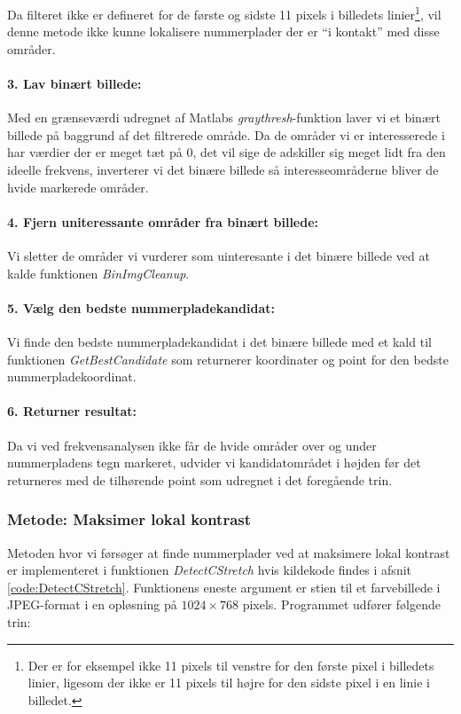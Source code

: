 Da filteret ikke er defineret for de første og sidste 11 pixels i billedets linier\footnote{Der er for eksempel ikke 11 pixels til venstre for den første pixel i billedets linier, ligesom der ikke er 11 pixels til højre for den sidste pixel i en linie i billedet.}, vil denne metode ikke kunne lokalisere nummerplader der er ``i kontakt'' med disse områder.

\paragraph{3. Lav binært billede:}
Med en grænseværdi udregnet af Matlabs \textit{graythresh}-funktion laver vi et binært billede på baggrund af det filtrerede område. Da de områder vi er interesserede i har værdier der er meget tæt på 0, det vil sige de adskiller sig meget lidt fra den ideelle frekvens, inverterer vi det binære billede så interesseområderne bliver de hvide markerede områder. 

\paragraph{4. Fjern uniteressante områder fra binært billede:}
Vi sletter de områder vi vurderer som uinteresante i det binære billede ved at kalde funktionen \textit{BinImgCleanup}.

\paragraph{5. Vælg den bedste nummerpladekandidat:}
Vi finde den bedste nummerpladekandidat i det binære billede med et kald til funktionen \textit{GetBestCandidate} som returnerer koordinater og point for den bedste nummerpladekoordinat.

\paragraph{6. Returner resultat:}
Da vi ved frekvensanalysen ikke får de hvide områder over og under nummerpladens tegn markeret, udvider vi kandidatområdet i højden før det returneres med de tilhørende point som udregnet i det foregående trin.


\subsubsection{Metode: Maksimer lokal kontrast}
Metoden hvor vi førsøger at finde nummerplader ved at maksimere lokal kontrast er implementeret i funktionen \textit{DetectCStretch} hvis kildekode findes i afsnit \vref{code:DetectCStretch}. Funktionens eneste argument er stien til et farvebillede i JPEG-format i en opløsning på $1024 \times 768$ pixels. Programmet udfører følgende trin:

